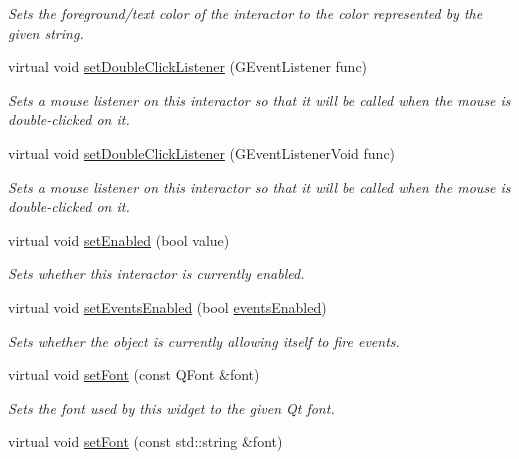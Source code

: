 \begin{DoxyCompactItemize}
\begin{DoxyCompactList}\small\item\em Sets the foreground/text color of the interactor to the color represented by the given string. \end{DoxyCompactList}\item 
virtual void \mbox{\hyperlink{classGInteractor_ac29f9a3462458e165fae3a1f046ee77a}{set\+Double\+Click\+Listener}} (G\+Event\+Listener func)
\begin{DoxyCompactList}\small\item\em Sets a mouse listener on this interactor so that it will be called when the mouse is double-\/clicked on it. \end{DoxyCompactList}\item 
virtual void \mbox{\hyperlink{classGInteractor_a50096194d66f48c92dd4c512d41bfc76}{set\+Double\+Click\+Listener}} (G\+Event\+Listener\+Void func)
\begin{DoxyCompactList}\small\item\em Sets a mouse listener on this interactor so that it will be called when the mouse is double-\/clicked on it. \end{DoxyCompactList}\item 
virtual void \mbox{\hyperlink{classGInteractor_ab831367dd84bbd579e02e55bacb21343}{set\+Enabled}} (bool value)
\begin{DoxyCompactList}\small\item\em Sets whether this interactor is currently enabled. \end{DoxyCompactList}\item 
virtual void \mbox{\hyperlink{classGObservable_afaa30b2a9e0f378fd1c70d2f1d0b8216}{set\+Events\+Enabled}} (bool \mbox{\hyperlink{classGInteractor_a597a370b592e3737d38d9d2f4e2031ea}{events\+Enabled}})
\begin{DoxyCompactList}\small\item\em Sets whether the object is currently allowing itself to fire events. \end{DoxyCompactList}\item 
virtual void \mbox{\hyperlink{classGInteractor_a2592348886ffea646c6534bf88f7c49d}{set\+Font}} (const Q\+Font \&font)
\begin{DoxyCompactList}\small\item\em Sets the font used by this widget to the given Qt font. \end{DoxyCompactList}\item 
virtual void \mbox{\hyperlink{classGInteractor_a8e096e8818d838aceae1d46d58fb3a7b}{set\+Font}} (const std\+::string \&font)

\end{DoxyCompactItemize}
